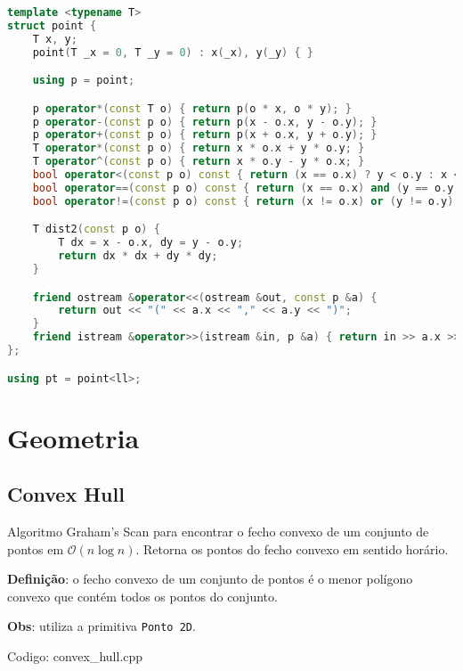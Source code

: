 \documentclass[10pt, a4paper, oneside]{book}
\begin{document}
\begin{lstlisting}[language=C++]
template <typename T>
struct point {
    T x, y;
    point(T _x = 0, T _y = 0) : x(_x), y(_y) { }

    using p = point;

    p operator*(const T o) { return p(o * x, o * y); }
    p operator-(const p o) { return p(x - o.x, y - o.y); }
    p operator+(const p o) { return p(x + o.x, y + o.y); }
    T operator*(const p o) { return x * o.x + y * o.y; }
    T operator^(const p o) { return x * o.y - y * o.x; }
    bool operator<(const p o) const { return (x == o.x) ? y < o.y : x < o.x; }
    bool operator==(const p o) const { return (x == o.x) and (y == o.y); }
    bool operator!=(const p o) const { return (x != o.x) or (y != o.y); }

    T dist2(const p o) {
        T dx = x - o.x, dy = y - o.y;
        return dx * dx + dy * dy;
    }

    friend ostream &operator<<(ostream &out, const p &a) {
        return out << "(" << a.x << "," << a.y << ")";
    }
    friend istream &operator>>(istream &in, p &a) { return in >> a.x >> a.y; }
};

using pt = point<ll>;\end{lstlisting}
\hfill

\newpage

%
%
%
%

\chapter{Geometria}

\section{Convex Hull}


Algoritmo Graham's Scan para encontrar o fecho convexo de um conjunto de pontos em $\mathcal{O}(n \log n)$. Retorna os pontos do fecho convexo em sentido horário.



\textbf{Definição}: o fecho convexo de um conjunto de pontos é o menor polígono convexo que contém todos os pontos do conjunto.



\textbf{Obs}: utiliza a primitiva \texttt{Ponto 2D}. 

\hfill

Codigo: convex\_hull.cpp
\end{document}
